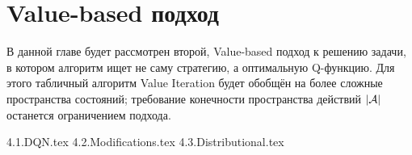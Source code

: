 \documentclass[../main.tex]{subfiles}
\begin{document}
\chapter{Value-based подход}\label{valuebasedchapter}

В данной главе будет рассмотрен второй, Value-based подход к решению задачи, в котором алгоритм ищет не саму стратегию, а оптимальную Q-функцию. Для этого табличный алгоритм Value Iteration будет обобщён на более сложные пространства состояний; требование конечности пространства действий $|\mathcal{A}|$ останется ограничением подхода.

{4.1.DQN.tex}
{4.2.Modifications.tex}
{4.3.Distributional.tex}
\end{document}
